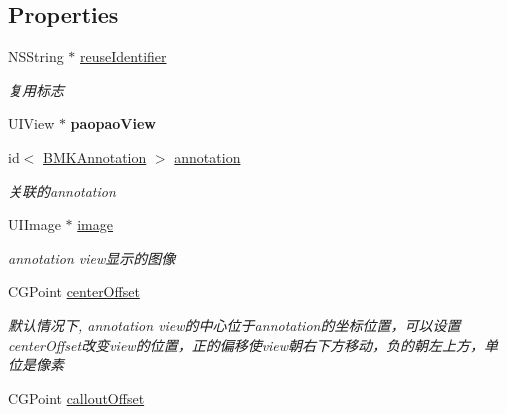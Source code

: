 \subsection*{Properties}
\begin{DoxyCompactItemize}
\item 
\hypertarget{interface_b_m_k_annotation_view_aba3efdbef49c0301af03ce0d47348358}{N\-S\-String $\ast$ \hyperlink{interface_b_m_k_annotation_view_aba3efdbef49c0301af03ce0d47348358}{reuse\-Identifier}}\label{interface_b_m_k_annotation_view_aba3efdbef49c0301af03ce0d47348358}

\begin{DoxyCompactList}\small\item\em 复用标志 \end{DoxyCompactList}\item 
\hypertarget{interface_b_m_k_annotation_view_a45b607eff441e212a1dd7c6d5846f4e3}{U\-I\-View $\ast$ {\bfseries paopao\-View}}\label{interface_b_m_k_annotation_view_a45b607eff441e212a1dd7c6d5846f4e3}

\item 
\hypertarget{interface_b_m_k_annotation_view_a466f040671f2235667a4034aba879bb5}{id$<$ \hyperlink{protocol_b_m_k_annotation-p}{B\-M\-K\-Annotation} $>$ \hyperlink{interface_b_m_k_annotation_view_a466f040671f2235667a4034aba879bb5}{annotation}}\label{interface_b_m_k_annotation_view_a466f040671f2235667a4034aba879bb5}

\begin{DoxyCompactList}\small\item\em 关联的annotation \end{DoxyCompactList}\item 
\hypertarget{interface_b_m_k_annotation_view_a3186f78dcb098002e39fd226cbc1c9b6}{U\-I\-Image $\ast$ \hyperlink{interface_b_m_k_annotation_view_a3186f78dcb098002e39fd226cbc1c9b6}{image}}\label{interface_b_m_k_annotation_view_a3186f78dcb098002e39fd226cbc1c9b6}

\begin{DoxyCompactList}\small\item\em annotation view显示的图像 \end{DoxyCompactList}\item 
\hypertarget{interface_b_m_k_annotation_view_a12a4f32e8adc7732c80d772eb403cd61}{C\-G\-Point \hyperlink{interface_b_m_k_annotation_view_a12a4f32e8adc7732c80d772eb403cd61}{center\-Offset}}\label{interface_b_m_k_annotation_view_a12a4f32e8adc7732c80d772eb403cd61}

\begin{DoxyCompactList}\small\item\em 默认情况下, annotation view的中心位于annotation的坐标位置，可以设置center\-Offset改变view的位置，正的偏移使view朝右下方移动，负的朝左上方，单位是像素 \end{DoxyCompactList}\item 
\hypertarget{interface_b_m_k_annotation_view_aacdcb492cbbc469803ba50def87f44e5}{C\-G\-Point \hyperlink{interface_b_m_k_annotation_view_aacdcb492cbbc469803ba50def87f44e5}{callout\-Offset}}\label{interface_b_m_k_annotation_view_aacdcb492cbbc469803ba50def87f44e5}


\end{DoxyCompactItemize}
